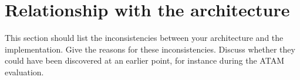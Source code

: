 \chapter{Relationship with the architecture}

This section should list the inconsistencies between your architecture and the implementation. Give the reasons for these inconsistencies. Discuss whether they could have been discovered at an earlier point, for instance during the ATAM evaluation.